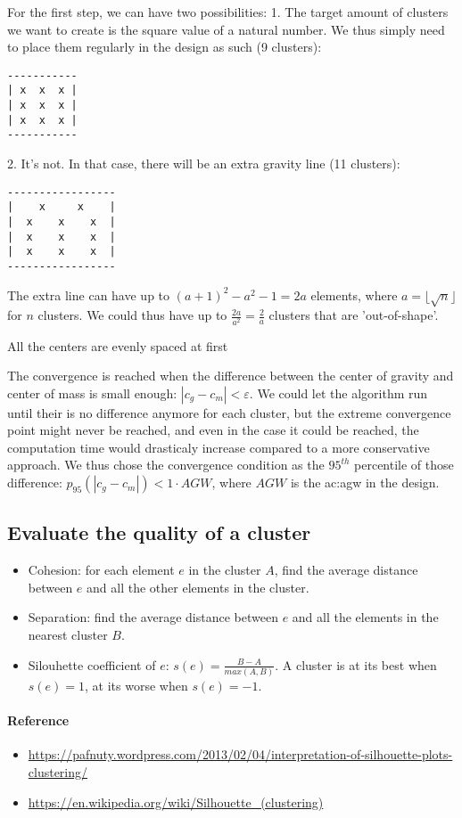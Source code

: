 For the first step, we can have two possibilities:
1. The target amount of clusters we want to create is the square value of a natural number.
We thus simply need to place them regularly in the design as such (9 clusters):
\begin{verbatim}
-----------
| x  x  x |
| x  x  x |
| x  x  x |
-----------
\end{verbatim}

2. It's not. In that case, there will be an extra gravity line (11 clusters):
\begin{verbatim}
-----------------
|    x     x    |
|  x    x    x  |
|  x    x    x  |
|  x    x    x  |
-----------------
\end{verbatim}
The extra line can have up to $(a+1)^2 - a^2 - 1 = 2a$ elements, where $a = \lfloor \sqrt{n} \rfloor$ for $n$ clusters.
We could thus have up to $\frac{2a}{a^2} = \frac{2}{a}$ clusters that are 'out-of-shape'.

All the centers are evenly spaced at first

The convergence is reached when the difference between the center of gravity and center of mass is small enough: $|c_g - c_m| < \varepsilon$.
We could let the algorithm run until their is no difference anymore for each cluster, but the extreme convergence point might never be reached, and even in the case it could be reached, the computation time would drasticaly increase compared to a more conservative approach.
We thus chose the convergence condition as the $95^{th}$ percentile of those difference: $p_{95}(|c_g - c_m|) < 1 \cdot AGW$, where $AGW$ is the \acrlong{ac:agw} in the design.




\subsection{Evaluate the quality of a cluster}
\begin{itemize}
	\item Cohesion: for each element $e$ in the cluster $A$, find the average distance between $e$ and all the other elements in the cluster.
	\item Separation: find the average distance between $e$ and all the elements in the nearest cluster $B$.
	\item Silouhette coefficient of $e$: $s(e) = \frac{B - A}{max(A,B)}$.
	A cluster is at its best when $s(e) = 1$, at its worse when $s(e) = -1$.
\end{itemize}

\paragraph{Reference}
\begin{itemize}
	\item \url{https://pafnuty.wordpress.com/2013/02/04/interpretation-of-silhouette-plots-clustering/}
	\item \url{https://en.wikipedia.org/wiki/Silhouette_(clustering)}
\end{itemize}